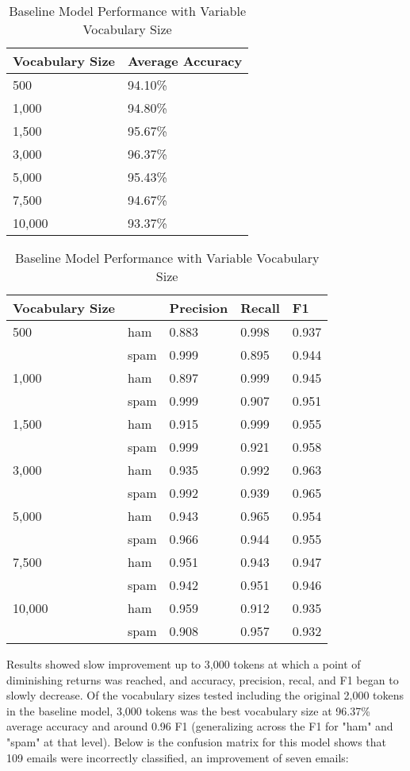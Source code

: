 \documentclass[a4paper]{article}
\begin{document}
	\begin{table}[H]
		\centering
		\caption{Baseline Model Performance with Variable Vocabulary Size}
		\begin{tabular}{ll}
			Vocabulary Size & Average Accuracy \\
			\hline
			500 & 94.10\% \\
			1,000 & 94.80\% \\
			1,500 & 95.67\% \\
			3,000 & 96.37\% \\
			5,000 & 95.43\% \\
			7,500 & 94.67\% \\
			10,000 & 93.37\%
		\end{tabular}
		\begin{tabular}{l|llll}
			Vocabulary Size & & Precision & Recall & F1 \\
			\hline
			500 & ham  & 0.883 & 0.998 & 0.937 \\
			    & spam & 0.999 & 0.895 & 0.944 \\
			\hline
			1,000 & ham  & 0.897 & 0.999 & 0.945 \\
			      & spam & 0.999 & 0.907 & 0.951 \\
			\hline
			1,500 & ham  & 0.915 & 0.999 & 0.955 \\
			      & spam & 0.999 & 0.921 & 0.958 \\
			\hline
			3,000 & ham  & 0.935 & 0.992 & 0.963 \\
				  & spam & 0.992 & 0.939 & 0.965 \\
			\hline
			5,000 & ham  & 0.943 & 0.965 & 0.954 \\
			      & spam & 0.966 & 0.944 & 0.955 \\
			\hline
			7,500 & ham  & 0.951 & 0.943 & 0.947 \\
			      & spam & 0.942 & 0.951 & 0.946 \\
     		\hline
			10,000 & ham  & 0.959 & 0.912 & 0.935 \\
			       & spam & 0.908 & 0.957 & 0.932
		\end{tabular}
	\end{table}

	Results showed slow improvement up to 3,000 tokens at which a point of diminishing returns was reached, and accuracy, precision, recal, and F1 began to slowly decrease. Of the vocabulary sizes tested including the original 2,000 tokens in the baseline model, 3,000 tokens was the best vocabulary size at 96.37\% average accuracy and around 0.96 F1 (generalizing across the F1 for "ham" and "spam" at that level). Below is the confusion matrix for this model shows that 109 emails were incorrectly classified, an improvement of seven emails:
	
\end{document}
